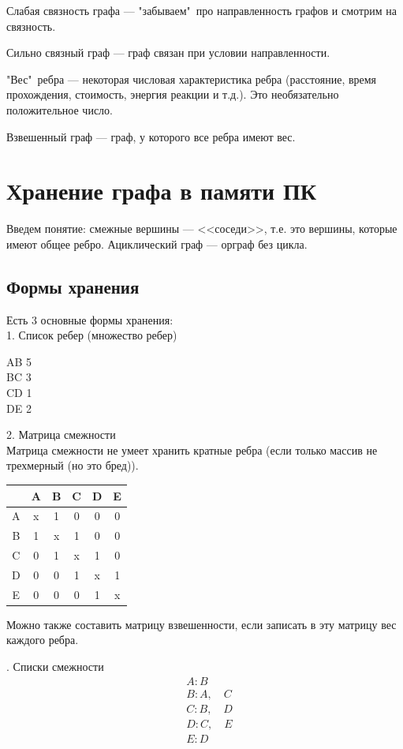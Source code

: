 Слабая связность графа --- "забываем"\  про направленность графов и смотрим на связность.

Сильно связный граф --- граф связан при условии направленности.

"Вес"\  ребра --- некоторая числовая характеристика ребра (расстояние, время прохождения, стоимость, энергия реакции и т.д.). Это необязательно положительное число.

Взвешенный граф --- граф, у которого все ребра имеют вес.

\section{Хранение графа в памяти ПК}
Введем понятие: смежные вершины --- <<соседи>>, т.е. это вершины, которые имеют общее ребро. Ациклический граф --- орграф без цикла.

\subsection{Формы хранения}
Есть 3 основные формы хранения:\\
1. Список ребер (множество ребер)
\begin{center}
AB 5\\
BC 3\\
CD 1\\
DE 2\\
\end{center}
2. Матрица смежности\\
Матрица смежности не умеет хранить кратные ребра (если только массив не трехмерный (но это бред)).

\begin{center}
\begin{tabular}{|c|c|c|c|c|c|}
	\hline 
	& A & B & C & D & E \\ 
	\hline 
	A & x & 1 & 0 & 0 & 0 \\ 
	\hline 
	B & 1 & x & 1 & 0 & 0 \\ 
	\hline 
	C & 0 & 1 & x & 1 & 0 \\ 
	\hline 
	D & 0 & 0 & 1 & x & 1 \\ 
	\hline 
	E & 0 & 0 & 0 & 1 & x \\ 
	\hline 
\end{tabular}
\end{center}

Можно  также составить матрицу взвешенности, если записать в эту матрицу вес каждого ребра.

. Списки смежности\\
\begin{align*}
&A : B\\
&B : A, \quad C\\
&C : B, \quad D\\
&D : C, \quad E\\
&E : D\\
\end{align*}

